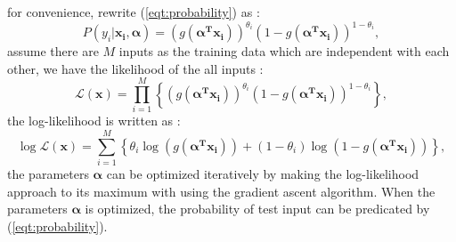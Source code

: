 \documentclass[journal]{IEEEtran}
\begin{document}
for convenience, rewrite (\ref{eqt:probability}) as :
\begin{equation} \label{eqt:probability_full}  
P(y_{i} | \boldsymbol{x_{i},\alpha}) = (g(\boldsymbol{\alpha^{T} x_{i}}))^{\theta_{i}}(1 -g(\boldsymbol{\alpha^{T} x_{i}}))^{1-\theta_{i}},
\end{equation}
assume there are $M$ inputs as the training data which are independent with each other, we have the likelihood of the all inputs :  
\begin{equation} \label{eqt:probability_all} 
\mathcal{L}(\boldsymbol{x}) =  \prod_{i=1}^{M}\left \{  (g(\boldsymbol{\alpha^{T} x_{i}}))^{\theta_{i}}(1 -g(\boldsymbol{\alpha^{T} x_{i}}))^{1-\theta_{i}}\right \},
\end{equation}
the log-likelihood is written as :
\begin{equation} \label{eqt:probability_all_log} 
\log\mathcal{L}(\boldsymbol{x}) =  \sum_{i=1}^{M}\left \{\theta_{i} \log(g(\boldsymbol{\alpha^{T} x_{i}})) + (1-\theta_{i}) \log(1 -g(\boldsymbol{\alpha^{T} x_{i}}))\right \},
\end{equation}
the parameters $\boldsymbol{\alpha}$ can be optimized iteratively by making the log-likelihood approach to its maximum with using the gradient ascent algorithm. When the parameters $\boldsymbol{\alpha}$ is optimized, the probability of test input can be predicated by (\ref{eqt:probability}).    
\end{document}
